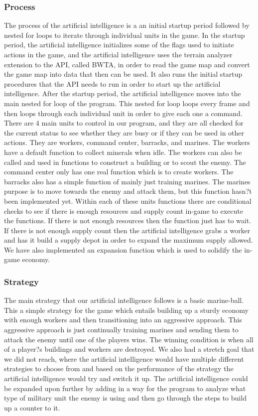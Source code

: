 \documentclass[10pt,letterpaper,onecolumn,draftclsnofoot]{IEEEtran}
\begin{document}
\subsubsection{Process}
The process of the artificial intelligence is a an initial startup period followed by nested for loops to iterate through individual units in the game. In the startup period, the artificial intelligence initializes some of the flags used to initiate actions in the game, and the artificial intelligence uses the terrain analyzer extension to the API, called BWTA, in order to read the game map and convert the game map into data that then can be used. It also runs the initial startup procedures that the API needs to run in order to start up the artificial intelligence. After the startup period, the artificial intelligence moves into the main nested for loop of the program. This nested for loop loops every frame and then loops through each individual unit in order to give each one a command. There are 4 main units to control in our program, and they are all checked for the current status to see whether they are busy or if they can be used in other actions. They are workers, command center, barracks, and marines. The workers have a default function to collect minerals when idle. The workers can also be called and used in functions to construct a building or to scout the enemy. The command center only has one real function which is to create workers. The barracks also has a simple function of mainly just training marines. The marines purpose is to move towards the enemy and attack them, but this function hasn?t been implemented yet. Within each of these units functions there are conditional checks to see if there is enough resources and supply count in-game to execute the functions. If there is not enough resources then the function just has to wait. If there is not enough supply count then the artificial intelligence grabs a worker and has it build a supply depot in order to expand the maximum supply allowed. We have also implemented an expansion function which is used to solidify the in-game economy.
\subsubsection{Strategy}
The main strategy that our artificial intelligence follows is a basic marine-ball. This a simple strategy for the game which entails building up a sturdy economy with enough workers and then transitioning into an aggressive approach. This aggressive approach is just continually training marines and sending them to attack the enemy until one of the players wins. The winning condition is when all of a player?s buildings and workers are destroyed. We also had a stretch goal that we did not reach, where the artificial intelligence would have multiple different strategies to choose from and based on the performance of the strategy the artificial intelligence would try and switch it up. The artificial intelligence could be expanded upon further by adding in a way for the program to analyze what type of military unit the enemy is using and then go through the steps to build up a counter to it.
\end{document}
